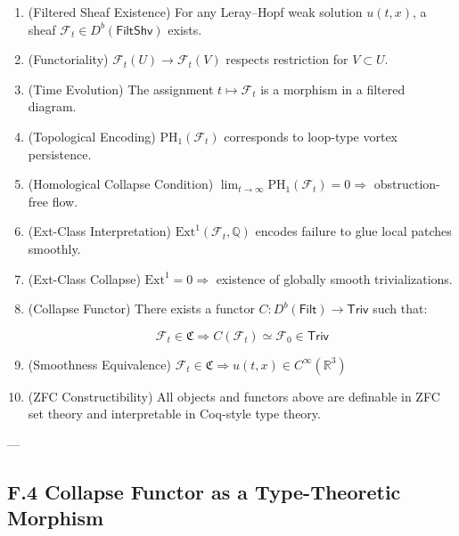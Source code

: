 \documentclass[11pt]{article}
\begin{document}
\begin{enumerate}
  \item[\textbf{A₀.}] (Filtered Sheaf Existence)  
  For any Leray–Hopf weak solution \( u(t,x) \), a sheaf \( \mathcal{F}_t \in D^b(\mathsf{FiltShv}) \) exists.

  \item[\textbf{A₁.}] (Functoriality)  
  \( \mathcal{F}_t(U) \to \mathcal{F}_t(V) \) respects restriction for \( V \subset U \).

  \item[\textbf{A₂.}] (Time Evolution)  
  The assignment \( t \mapsto \mathcal{F}_t \) is a morphism in a filtered diagram.

  \item[\textbf{A₃.}] (Topological Encoding)  
  \( \mathrm{PH}_1(\mathcal{F}_t) \) corresponds to loop-type vortex persistence.

  \item[\textbf{A₄.}] (Homological Collapse Condition)  
  \( \lim_{t \to \infty} \mathrm{PH}_1(\mathcal{F}_t) = 0 \Rightarrow \) obstruction-free flow.

  \item[\textbf{A₅.}] (Ext-Class Interpretation)  
  \( \mathrm{Ext}^1(\mathcal{F}_t, \mathbb{Q}) \) encodes failure to glue local patches smoothly.

  \item[\textbf{A₆.}] (Ext-Class Collapse)  
  \( \mathrm{Ext}^1 = 0 \Rightarrow \) existence of globally smooth trivializations.

  \item[\textbf{A₇.}] (Collapse Functor)  
  There exists a functor \( C: D^b(\mathsf{Filt}) \to \mathsf{Triv} \) such that:

  \[
  \mathcal{F}_t \in \mathfrak{C} \Rightarrow C(\mathcal{F}_t) \simeq \mathcal{F}_0 \in \mathsf{Triv}
  \]

  \item[\textbf{A₈.}] (Smoothness Equivalence)  
  \( \mathcal{F}_t \in \mathfrak{C} \Rightarrow u(t,x) \in C^\infty(\mathbb{R}^3) \)

  \item[\textbf{A₉.}] (ZFC Constructibility)  
  All objects and functors above are definable in ZFC set theory and interpretable in Coq-style type theory.
\end{enumerate}

---

\subsection*{F.4 Collapse Functor as a Type-Theoretic Morphism}
\end{document}
